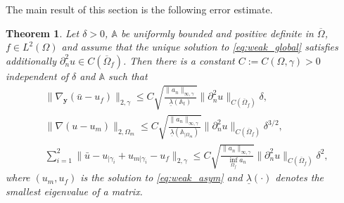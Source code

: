 \documentclass[a4paper]{article}
\newtheorem{theorem}{Theorem}
\def\vc#1{\mathbf{\boldsymbol{#1}}}     %
\def\tn#1{{\mathbb{#1}}}    %
\def\norm#1{\|#1\|}
\def\yy{{\vc y}}
\begin{document}
The main result of this section is the following error estimate.
\begin{theorem}
\label{th:error_estimate}
Let $\delta>0$, $\tn A$ be uniformly bounded and positive definite in $\overline\Omega$, $f\in L^2(\Omega)$ and assume that the unique solution to \eqref{eq:weak_global} satisfies additionally $\partial_n^2 u\in C(\overline\Omega_f)$.
Then there is a constant $C:=C(\Omega,\gamma)>0$ independent of $\delta$ and $\tn A$ such that
\begin{subequations}
\label{eq:error_estimates_delta}
\begin{align}
&\norm{\nabla_\yy(\bar u- u_f)}_{2,\gamma} \le C\sqrt{\frac{\norm{a_n}_{\infty,\gamma}}{\underline\lambda(\tn A_t)}}\norm{\partial_n^2 u}_{C(\overline\Omega_f)}\delta,\\
&\norm{\nabla(u-u_m)}_{2,\Omega_m} \le C\sqrt{\frac{\norm{a_n}_{\infty,\gamma}}{\underline\lambda(\tn A_{|\Omega_m})}}\norm{\partial_n^2 u}_{C(\overline\Omega_f)}\delta^{3/2},\\
&\sum_{i=1}^2\norm{\bar u-u_{|\gamma_i}+u_{m|\gamma_i}-u_f}_{2,\gamma} \le C\sqrt{\frac{\norm{a_n}_{\infty,\gamma}}{\inf_{\Omega_f}a_n}}\norm{\partial_n^2 u}_{C(\overline\Omega_f)}\delta^2,
\end{align}
\end{subequations}
where $(u_m,u_f)$ is the solution to \eqref{eq:weak_asym} and $\underline\lambda(\cdot)$ denotes the smallest eigenvalue of a matrix.
\end{theorem}
\end{document}
